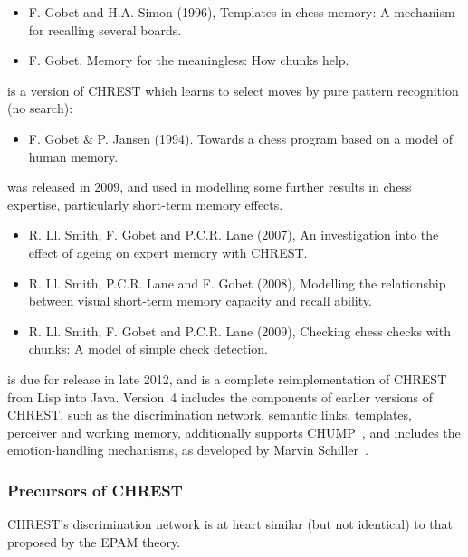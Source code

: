 \documentclass{article}
\begin{document}
\begin{itemize}
\item F. Gobet and H.A. Simon (1996), Templates in chess memory: A mechanism for 
recalling several boards.~\cite{Gobet96b}
\item F. Gobet, Memory for the meaningless: How chunks help.~\cite{Gobet98a}
\end{itemize}

 is a version of CHREST which learns to select moves by pure
pattern recognition (no search):

\begin{itemize}
\item F. Gobet \& P. Jansen (1994). Towards a chess program based on a model of
human memory.~\cite{Gobet94} 
\end{itemize}

 was released in 2009, and used in modelling
some further results in chess expertise, particularly short-term memory
effects.

\begin{itemize}
\item R. Ll. Smith, F. Gobet and P.C.R. Lane (2007), An investigation into the
effect of ageing on expert memory with CHREST.~\cite{Smith07}
\item R. Ll. Smith, P.C.R. Lane and F. Gobet (2008), Modelling the relationship
between visual short-term memory capacity and recall ability.~\cite{Smith08}
\item R. Ll. Smith, F. Gobet and P.C.R. Lane (2009), Checking chess checks with
chunks: A model of simple check detection.~\cite{Smith09}
\end{itemize}

 is due for release in late 2012, and is a
complete reimplementation of CHREST from Lisp into Java.  Version~4 includes
the components of earlier versions of CHREST, such as the discrimination network,
semantic links, templates, perceiver and working memory, additionally supports
CHUMP~\cite{Bossomaier12,Gobet94}, and includes the emotion-handling
mechanisms, as developed by Marvin Schiller~\cite{Gobet11a}.

\subsubsection{Precursors of CHREST}

CHREST's discrimination network is at heart similar (but not
identical) to that proposed by the EPAM theory.
\end{document}

